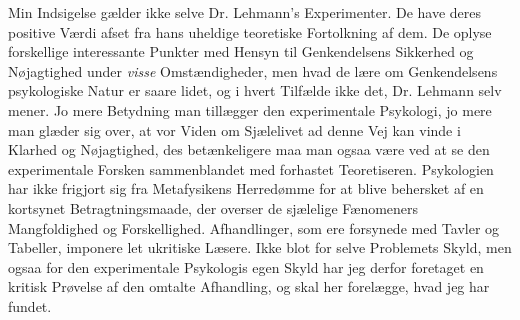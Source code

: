 \documentclass[12pt,a4paper,openany]{book}
\begin{document}
Min Indsigelse gælder ikke selve Dr. Lehmann's Experimenter. De have deres
positive Værdi afset fra hans uheldige teoretiske Fortolkning af dem. De oplyse
forskellige interessante Punkter med Hensyn til Genkendelsens Sikkerhed og
Nøjagtighed under \emph{visse} Omstændigheder, men hvad de lære om
Genkendelsens psykologiske Natur er saare lidet, og i hvert Tilfælde ikke det,
Dr. Lehmann selv mener. Jo mere Betydning man tillægger den experimentale
Psykologi, jo mere man glæder sig over, at vor Viden om Sjælelivet ad denne Vej
kan vinde i Klarhed og Nøjagtighed, des betænkeligere maa man ogsaa være ved at
se den experimentale Forsken sammenblandet med forhastet Teoretiseren.
Psykologien har ikke frigjort sig fra Metafysikens Herredømme for at blive
behersket af en kortsynet Betragtningsmaade, der overser de sjælelige
Fænomeners Mangfoldighed og Forskellighed. Afhandlinger, som ere forsynede med
Tavler og Tabeller, imponere let ukritiske Læsere. Ikke blot for selve
Problemets Skyld, men ogsaa for den experimentale Psykologis egen Skyld har jeg
derfor foretaget en kritisk Prøvelse af den omtalte Afhandling, og skal her
forelægge, hvad jeg har fundet.
\end{document}
